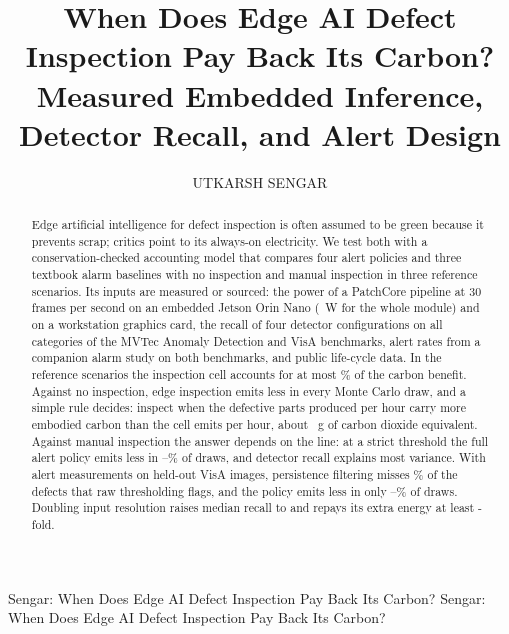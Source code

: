 \documentclass{ieeeaccess}
\begin{document}

\title{When Does Edge AI Defect Inspection Pay Back Its Carbon? Measured Embedded Inference, Detector Recall, and Alert Design}
\author{\uppercase{Utkarsh Sengar}}
\address[1]{Independent Researcher, Dharwad, Karnataka, India}

\markboth
{Sengar: When Does Edge AI Defect Inspection Pay Back Its Carbon?}
{Sengar: When Does Edge AI Defect Inspection Pay Back Its Carbon?}


\begin{abstract}
Edge artificial intelligence for defect inspection is often assumed to be green because it prevents scrap; critics point to its always-on electricity. We test both with a conservation-checked accounting model that compares four alert policies and three textbook alarm baselines with no inspection and manual inspection in three reference scenarios. Its inputs are measured or sourced: the power of a PatchCore pipeline at 30 frames per second on an embedded Jetson Orin Nano (\JetsonFullTotalPower~W for the whole module) and on a workstation graphics card, the recall of four detector configurations on all \DetCategories{} categories of the MVTec Anomaly Detection and VisA benchmarks, alert rates from a companion alarm study on both benchmarks, and public life-cycle data. In the reference scenarios the inspection cell accounts for at most \EdgeOfBenefitMax\% of the carbon benefit. Against no inspection, edge inspection emits less in every Monte Carlo draw, and a simple rule decides: inspect when the defective parts produced per hour carry more embodied carbon than the cell emits per hour, about \NomogramGramsPerHour~g of carbon dioxide equivalent. Against manual inspection the answer depends on the line: at a strict threshold the full alert policy emits less in \McProbLMin--\McProbLMax\% of draws, and detector recall explains most variance. With alert measurements on held-out VisA images, persistence filtering misses \VisaRecallLossFull\% of the defects that raw thresholding flags, and the policy emits less in only \VisaMcProbLMin--\VisaMcProbLMax\% of draws. Doubling input resolution raises median recall to \CrHiresRecall{} and repays its extra energy at least \CrHiresPaybackMin-fold.
\end{abstract}
\end{document}

